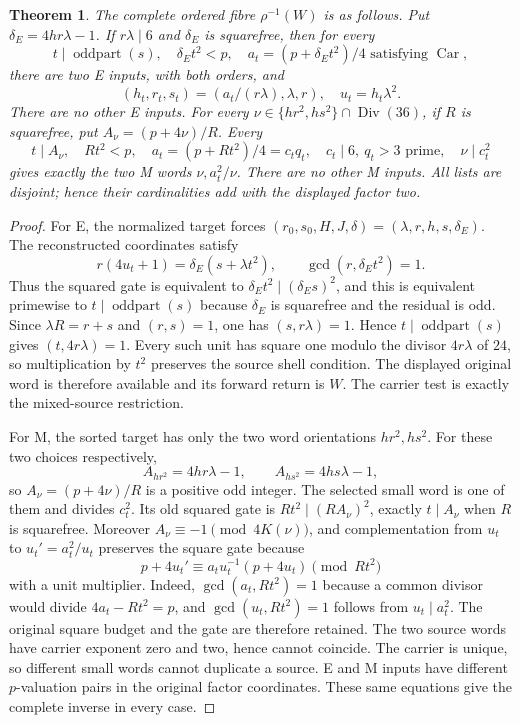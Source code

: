 \documentclass[10pt,reqno]{amsart}
\newtheorem{theorem}{Theorem}\newtheorem{proposition}[theorem]{Proposition}
\begin{document}
\begin{theorem}
The complete ordered fibre $\rho^{-1}(W)$ is as follows.
Put $\delta_E=4hr\lambda-1$. If $r\lambda\mid6$ and $\delta_E$ is squarefree,
then for every
\[
 t\mid\operatorname{oddpart}(s),\quad\delta_Et^2<p,\quad
 a_t=(p+\delta_Et^2)/4\text{ satisfying }\operatorname{Car},
\]
there are two E inputs, with both orders, and
\[
 (h_t,r_t,s_t)=\left(a_t/(r\lambda),\lambda,r\right),\quad
 u_t=h_t\lambda^2.
\]
There are no other E inputs. For every
$\nu\in\{hr^2,hs^2\}\cap\operatorname{Div}(36)$, if $R$ is squarefree,
put $A_\nu=(p+4\nu)/R$. Every
\[
 t\mid A_\nu,\quad Rt^2<p,\quad
 a_t=(p+Rt^2)/4=c_tq_t,\quad c_t\mid6,\ q_t>3\text{ prime},\quad
 \nu\mid c_t^2
\]
gives exactly the two M words $\nu,a_t^2/\nu$. There are no other M inputs.
All lists are disjoint; hence their cardinalities add with the displayed
factor two.
\end{theorem}
\begin{proof}
For E, the normalized target forces
$(r_0,s_0,H,J,\delta)=(\lambda,r,h,s,\delta_E)$.
The reconstructed coordinates satisfy
\[
 r(4u_t+1)=\delta_E(s+\lambda t^2),\qquad
 \gcd(r,\delta_Et^2)=1.
\]
Thus the squared gate is equivalent to
$\delta_Et^2\mid(\delta_Es)^2$, and this is equivalent primewise to
$t\mid\operatorname{oddpart}(s)$ because $\delta_E$ is squarefree and the
residual is odd. Since $\lambda R=r+s$ and $(r,s)=1$, one has
$(s,r\lambda)=1$. Hence $t\mid\operatorname{oddpart}(s)$ gives
$(t,4r\lambda)=1$. Every such unit has square one modulo the divisor
$4r\lambda$ of $24$, so multiplication by $t^2$ preserves the source shell
condition. The displayed original word is therefore available and its forward
return is $W$. The carrier test is exactly the mixed-source restriction.

For M, the sorted target has only the two word orientations $hr^2,hs^2$.
For these two choices respectively,
\[
 A_{hr^2}=4hr\lambda-1,\qquad A_{hs^2}=4hs\lambda-1,
\]
so $A_\nu=(p+4\nu)/R$ is a positive odd integer. The selected small word is
one of them and divides $c_t^2$. Its old squared
gate is $Rt^2\mid(RA_\nu)^2$, exactly $t\mid A_\nu$ when $R$ is squarefree.
Moreover $A_\nu\equiv-1\pmod{4K(\nu)}$, and complementation from $u_t$ to
$u_t'=a_t^2/u_t$ preserves the square gate because
\[
 p+4u_t'\equiv a_tu_t^{-1}(p+4u_t)\pmod{Rt^2}
\]
with a unit multiplier.  Indeed, $\gcd(a_t,Rt^2)=1$ because a common
divisor would divide $4a_t-Rt^2=p$, and $\gcd(u_t,Rt^2)=1$ follows from
$u_t\mid a_t^2$. The original square budget and the gate are therefore
retained. The two
source words have carrier exponent zero and two, hence cannot coincide.
The carrier is unique, so different small words cannot duplicate a source.
E and M inputs have different $p$-valuation pairs in the original factor
coordinates. These same equations give the complete inverse in every case.
\end{proof}
\end{document}
